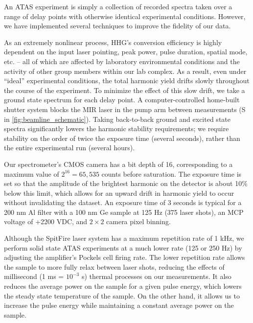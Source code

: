 An ATAS experiment is simply a collection of recorded spectra taken over a range of delay points with otherwise identical experimental conditions. However, we have implemented several techniques to improve the fidelity of our data.

As an extremely nonlinear process, HHG's conversion efficiency is highly dependent on the input laser pointing, peak power, pulse duration, spatial mode, etc. -- all of which are affected by laboratory environmental conditions and the activity of other group members within our lab complex. As a result, even under ``ideal'' experimental conditions, the total harmonic yield drifts slowly throughout the course of the experiment. To minimize the effect of this slow drift, we take a ground state spectrum for each delay point. A computer-controlled home-built shutter system blocks the MIR laser in the pump arm between measurements (S in \cref{fig:beamline_schematic}). Taking back-to-back ground and excited state spectra significantly lowers the harmonic stability requirements; we require stability on the order of twice the exposure time (several seconds), rather than the entire experimental run (several hours).

Our spectrometer's CMOS camera has a bit depth of 16, corresponding to a maximum value of $2^{16} = 65,535$ counts before saturation. The exposure time is set so that the amplitude of the brightest harmonic on the detector is about 10\% below this limit, which allows for an upward drift in harmonic yield to occur without invalidating the dataset. An exposure time of 3 seconds is typical for a 200 nm Al filter with a 100 nm Ge sample at 125 Hz (375 laser shots), an MCP voltage of +2200 VDC, and $2 \times 2$ camera pixel binning.

Although the SpitFire laser system has a maximum repetition rate of 1 kHz, we perform solid state ATAS experiments at a much lower rate (125 or 250 Hz) by adjusting the amplifier's Pockels cell firing rate. The lower repetition rate allows the sample to more fully relax between laser shots, reducing the effects of millisecond (1 ms = $10^{-3}$ s) thermal processes on our measurements. It also reduces the average power on the sample for a given pulse energy, which lowers the steady state temperature of the sample. On the other hand, it allows us to increase the pulse energy while maintaining a constant average power on the sample.

